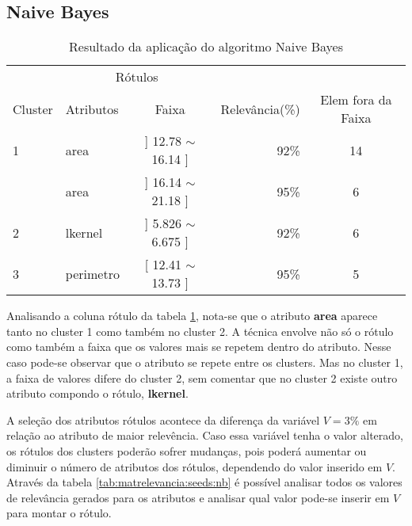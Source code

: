 \subsection{Naive Bayes} \label{cap:resultados:ssec:seed:nb}
\begin{table}[!h]
\centering
\caption{Resultado da aplicação do algoritmo Naive Bayes}
\label{tab:rot:seeds:nb}
\begin{tabular}{llcrc}
\hline
\multicolumn{1}{c}{\cellcolor[HTML]{FFFFFF}} & \multicolumn{2}{c}{Rótulos}                & \multicolumn{1}{r}{}               & \\ \cline{2-3}
Cluster                                      & Atributos      & \multicolumn{1}{c}{Faixa} & \multicolumn{1}{c}{Relevância(\%)} & Elem fora da Faixa\\ \hline \hline
1                                            & area           & ] 12.78 $\sim$  16.14 ]   & 92\%                               & 14\\  \hline
                                             & area           & ] 16.14 $\sim$  21.18 ]   & 95\%                               & 6\\ 
\multirow{-2}{*}{2}                          & lkernel        & ] 5.826 $\sim$  6.675 ]   & 92\%                               & 6\\  \hline
3                                            & perimetro      & [ 12.41 $\sim$  13.73 ]   & 95\%                               & 5\\ \hline \hline
\end{tabular}
\end{table}



Analisando a coluna rótulo da tabela \ref{tab:rot:seeds:nb}, nota-se que o atributo \textbf{area} aparece tanto no  cluster 1 como também no cluster 2. A técnica envolve não só o rótulo como também a faixa que os valores mais se repetem dentro do atributo. Nesse caso pode-se observar que o atributo se repete entre os clusters. Mas no cluster 1, a faixa de valores difere do cluster 2, sem comentar que no cluster 2 existe outro atributo compondo o rótulo, \textbf{lkernel}.

A seleção dos atributos rótulos acontece da diferença da variável ${V=3\%}$ em relação ao atributo de maior relevência. Caso essa variável tenha o valor alterado, os rótulos dos clusters poderão sofrer mudanças, pois poderá aumentar  ou diminuir o número de atributos dos rótulos, dependendo do valor inserido em ${V}$. Através da tabela \ref{tab:matrelevancia:seeds:nb} é possível analisar todos os valores de relevância gerados para os atributos e analisar qual valor pode-se inserir em ${V}$ para montar o rótulo.

